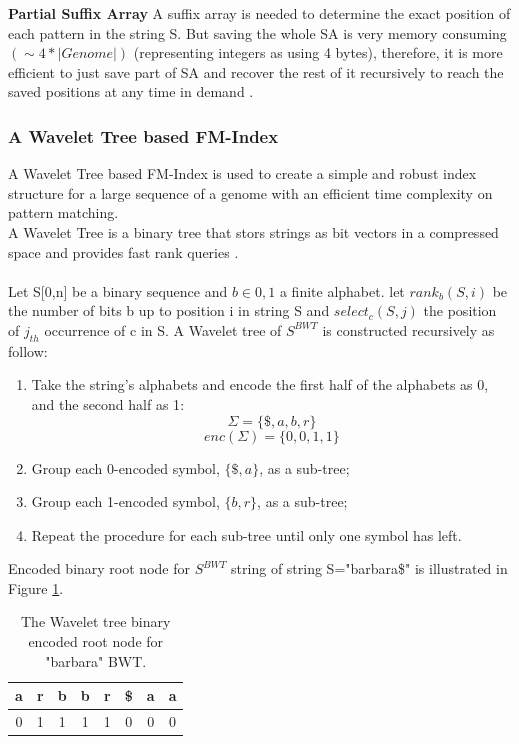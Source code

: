 \documentclass[11pt,a4paper]{report}
\begin{document}
\textbf{Partial Suffix Array} A suffix array is needed to determine the 
exact position of each pattern in the string S. But saving the whole SA
is very memory consuming $(\sim 4 * \lvert Genome \rvert)$ (representing
integers as using 4 bytes), therefore, it is more efficient to just save 
part of SA and recover the rest of it recursively to reach the saved positions 
at any time in demand \cite{Wavthesis}.\\




\subsubsection{A Wavelet Tree based FM-Index}
\label{A Wavelet Tree based FM-Index}


A Wavelet Tree based FM-Index is used to create a simple and robust 
index structure for a large sequence of a genome with an efficient
time complexity on pattern matching.\\
A Wavelet Tree is a binary tree that stors strings as bit vectors in a 
compressed space and provides fast rank queries \cite{navarroWavelet}
\cite{Wavthesis}\cite{AlexBowe}.\\\\
Let S[0,n] be a binary sequence and $b \in {0,1}$ a finite alphabet. 
let $ rank_{b}(S,i)$ be the number of bits b up to position i in string S 
and $ select_{c}(S,j)$  the position of $j_{th}$ occurrence of c in S.
A Wavelet tree of $S^{BWT}$ is constructed recursively as follow:
\begin{enumerate}
    \item
		Take the string's alphabets and encode the first half of the 
		alphabets as 0, and the second half as 1\cite {AlexBowe}:
    		$$\Sigma = \{ \$, a, b, r \}$$
			$$enc(\Sigma) = \{ 0, 0, 1, 1 \}$$
    \item
		Group each 0-encoded symbol, $\{ \$, a \}$, as a sub-tree;
    \item
		Group each 1-encoded symbol, $\{ b , r\}$, as a sub-tree;
    \item
		Repeat the procedure for each sub-tree until only one symbol has left.
\end{enumerate}

Encoded binary root node for $S^{BWT}$ string of string S="barbara\$" 
is illustrated in Figure \ref{binary-root}.
			\begin{table}[h]
			\centering
			  \begin{tabular}{ c c c c c c c c}
				   a  & r & b & b & r & \$ & a & a \\ 
				  \hline
				   0 &	1 &	1 & 1 & 1 & 0 & 0 & 0\\  
				  \hline
			  \end{tabular}
			\caption{The Wavelet tree binary encoded root node for "barbara" BWT.}
			\label{binary-root}
			\end{table}
\end{document}
